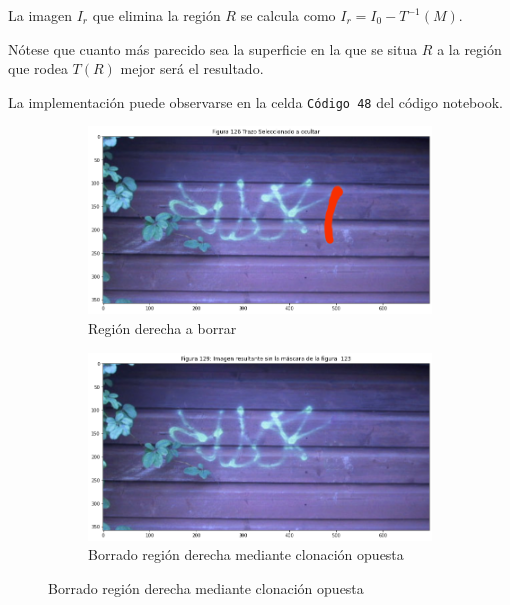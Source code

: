 \documentclass[11pt,twoside,titlepage,a4paper]{article}
\numberwithin{equation}{section} %
\theoremstyle{usual}
\begin{document}
La imagen $I_r$ que elimina la región $R$ se calcula como  $I_r = I_0 - T^{-1}(M)$.
 
Nótese que cuanto más parecido sea la superficie en la que se situa $R$ a la región que rodea $T(R)$ mejor será el resultado. 

La implementación puede observarse en la celda \texttt{Código 48} del código notebook.

\begin{figure}[h]
    \centering
    \begin{subfigure}[t]{.45\textwidth}
        \centering
        \includegraphics[width=\textwidth]{imagenes/PoissonImageEditing_cell_120_output_4.png}
        \caption{Región derecha a borrar}
        \label{fig:seleccionDerecha}
    \end{subfigure}
    \centering
    \begin{subfigure}[t]{.45\textwidth}
        \centering
        \includegraphics[width=\textwidth]{imagenes/PoissonImageEditing_cell_120_output_7.png}
        \caption{Borrado región derecha mediante clonación opuesta}
        \label{fig:borradoDerechoOpuesto}
    \end{subfigure}

\end{figure}
\end{document}
